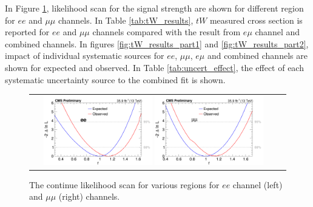 In Figure \ref{fig:scan}, likelihood scan for the signal strength are shown for different region for $ee$ and $\mu\mu$ channels.
In Table \ref{tab:tW_results}, $tW$ measured cross section is reported for $ee$ and $\mu\mu$ channels compared with the result from $e\mu$ channel and combined channels.
In figures \ref{fig:tW_results_part1} and \ref{fig:tW_results_part2}, impact of individual systematic sources for $ee$, $\mu\mu$, $e\mu$ and combined channels are shown for expected and observed.
In Table \ref{tab:uncert_effect}, the effect of each systematic uncertainty source to the combined fit is shown.

\begin{figure}[ht]
  \begin{center}
    \begin{tabular}{cc}
      \includegraphics[width=0.45\textwidth]{figures/tW/fig/tW_result/Result/scan_plot/ee__scan.png}
      \includegraphics[width=0.45\textwidth]{figures/tW/fig/tW_result/Result/scan_plot/mumu__scan.png}
    \end{tabular}
    \caption{The continue likelihood scan  for various regions for $ee$ channel (left) and $\mu\mu$ (right) channels.
    \label{fig:scan}}
  \end{center}
\end{figure}


